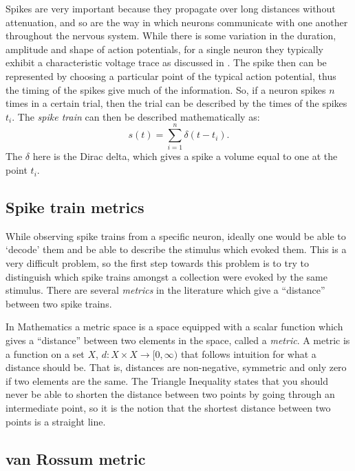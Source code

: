 Spikes are very important because they propagate over long distances without 
attenuation, and so are the way in which neurons communicate with one another 
throughout the nervous system.  While there is some variation in 
the duration, amplitude and shape of action potentials, for a single neuron they typically exhibit a characteristic voltage trace as discussed in \cite{Lewicki1998a}. The spike then can be represented by choosing a particular point of the typical action potential, thus the timing of the spikes give much of the information.  So, 
if a neuron spikes $n$ times in a certain trial, then the trial can be 
described by the times of the spikes $t_i$.  The 
\emph{spike train} can then be described mathematically as:
\begin{equation}
s(t) = \sum_{i=1}^n \delta(t-t_i).
\end{equation}
The $\delta$ here is the Dirac delta, which gives a spike a volume equal to 
one at the point $t_i$.

\subsection{Spike train metrics}

While observing spike trains from a specific neuron, ideally one would be able to 
\lq{}decode\rq{} them and be able to describe the stimulus which evoked them.  
This is a very difficult problem, so the first step towards this problem is to try to distinguish which spike trains amongst a collection were evoked by 
the same stimulus.  There are several {\sl metrics} in the 
literature which give a ``distance'' between two spike trains.  

In Mathematics a metric space is a space equipped with a scalar function which gives a  
``distance'' between two elements in the space, called a \emph{metric}.  A metric is a function on a set 
$X$, $d: X\times X \rightarrow [0,\infty )$ that follows  
intuition for what a distance should be. That is, distances are non-negative, 
symmetric and only zero if two elements are the same. The Triangle Inequality 
states that you should never be able to shorten the distance between two points 
by going through an intermediate point, so it is the notion that the shortest 
distance between two points is a straight line.


\subsection{van Rossum metric}

